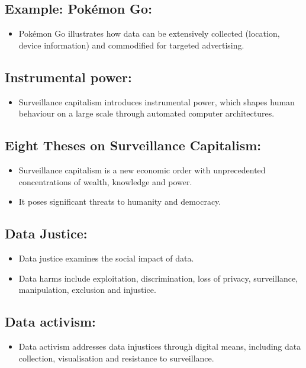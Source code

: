 \documentclass{article}
\begin{document}
\subsection*{Example: Pokémon Go:}
\begin{itemize}
    \item Pokémon Go illustrates how data can be extensively collected (location, device information) and commodified for targeted advertising.
\end{itemize}

\subsection*{Instrumental power:}
\begin{itemize}
    \item Surveillance capitalism introduces instrumental power, which shapes human behaviour on a large scale through automated computer architectures.
\end{itemize}

\subsection*{Eight Theses on Surveillance Capitalism:}
\begin{itemize}
    \item Surveillance capitalism is a new economic order with unprecedented concentrations of wealth, knowledge and power.
    \item It poses significant threats to humanity and democracy.
\end{itemize}

\subsection*{Data Justice:}
\begin{itemize}
    \item Data justice examines the social impact of data.
    \item Data harms include exploitation, discrimination, loss of privacy, surveillance, manipulation, exclusion and injustice.
\end{itemize}

\subsection*{Data activism:}
\begin{itemize}
    \item Data activism addresses data injustices through digital means, including data collection, visualisation and resistance to surveillance.
\end{itemize}
\end{document}
